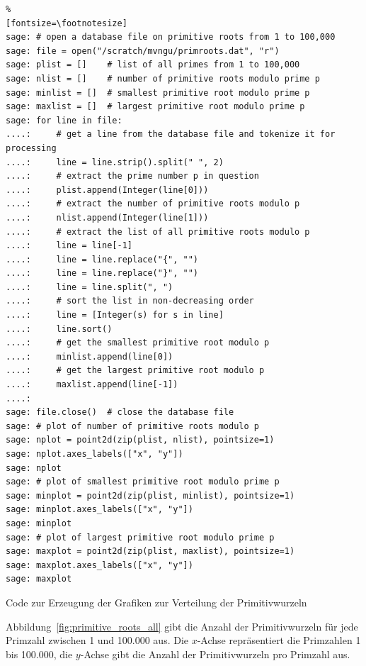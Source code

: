 \begin{refsegment}
\begin{sagecode}
\begin{Verbatim}%
[fontsize=\footnotesize]
sage: # open a database file on primitive roots from 1 to 100,000
sage: file = open("/scratch/mvngu/primroots.dat", "r")
sage: plist = []    # list of all primes from 1 to 100,000
sage: nlist = []    # number of primitive roots modulo prime p
sage: minlist = []  # smallest primitive root modulo prime p
sage: maxlist = []  # largest primitive root modulo prime p
sage: for line in file:
....:     # get a line from the database file and tokenize it for processing
....:     line = line.strip().split(" ", 2)
....:     # extract the prime number p in question
....:     plist.append(Integer(line[0]))
....:     # extract the number of primitive roots modulo p
....:     nlist.append(Integer(line[1]))
....:     # extract the list of all primitive roots modulo p
....:     line = line[-1]
....:     line = line.replace("{", "")
....:     line = line.replace("}", "")
....:     line = line.split(", ")
....:     # sort the list in non-decreasing order
....:     line = [Integer(s) for s in line]
....:     line.sort()
....:     # get the smallest primitive root modulo p
....:     minlist.append(line[0])
....:     # get the largest primitive root modulo p
....:     maxlist.append(line[-1])
....:
sage: file.close()  # close the database file
sage: # plot of number of primitive roots modulo p
sage: nplot = point2d(zip(plist, nlist), pointsize=1)
sage: nplot.axes_labels(["x", "y"])
sage: nplot
sage: # plot of smallest primitive root modulo prime p
sage: minplot = point2d(zip(plist, minlist), pointsize=1)
sage: minplot.axes_labels(["x", "y"])
sage: minplot
sage: # plot of largest primitive root modulo prime p
sage: maxplot = point2d(zip(plist, maxlist), pointsize=1)
sage: maxplot.axes_labels(["x", "y"])
sage: maxplot
\end{Verbatim}
\caption{Code zur Erzeugung der Grafiken zur Verteilung der Primitivwurzeln}
\label{l:Sagecode_Graphics-Distribution-PrimRoots}{}
\end{sagecode}




Abbildung~\ref{fig:primitive_roots_all} gibt die Anzahl der Primitivwurzeln
für jede Primzahl zwischen 1 und 100.000 aus. Die $x$-Achse repräsentiert
die Primzahlen 1 bis 100.000, die $y$-Achse gibt die Anzahl der Primitivwurzeln
pro Primzahl aus.


\end{refsegment}
